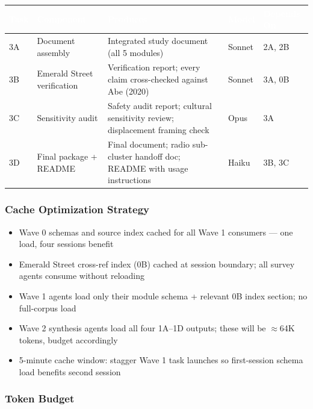 \documentclass[11pt,letterpaper]{article}
\newcommand{\tableheader}[1]{\textbf{\sffamily\textcolor{white}{#1}}}
\begin{document}
\begin{center}
\begin{tabularx}{\textwidth}{L{0.8cm}L{3cm}XC{1.5cm}C{2cm}}
\toprule
{}
\tableheader{Task} & \tableheader{Component} & \tableheader{Produces} & \tableheader{Model} & \tableheader{Depends On} \\
\midrule
3A & Document assembly & Integrated study document (all 5 modules) & Sonnet & 2A, 2B \\
3B & Emerald Street verification & Verification report; every claim cross-checked against Abe (2020) & Sonnet & 3A, 0B \\
3C & Sensitivity audit & Safety audit report; cultural sensitivity review; displacement framing check & Opus & 3A \\
3D & Final package + README & Final document; radio sub-cluster handoff doc; README with usage instructions & Haiku & 3B, 3C \\
\bottomrule
\end{tabularx}
\end{center}

\subsubsection{Cache Optimization Strategy}

\begin{itemize}
  \item Wave 0 schemas and source index cached for all Wave 1 consumers --- one load, four sessions benefit
  \item Emerald Street cross-ref index (0B) cached at session boundary; all survey agents consume without reloading
  \item Wave 1 agents load only their module schema + relevant 0B index section; no full-corpus load
  \item Wave 2 synthesis agents load all four 1A--1D outputs; these will be $\approx$64K tokens, budget accordingly
  \item 5-minute cache window: stagger Wave 1 task launches so first-session schema load benefits second session
\end{itemize}

\subsubsection{Token Budget}
\end{document}
